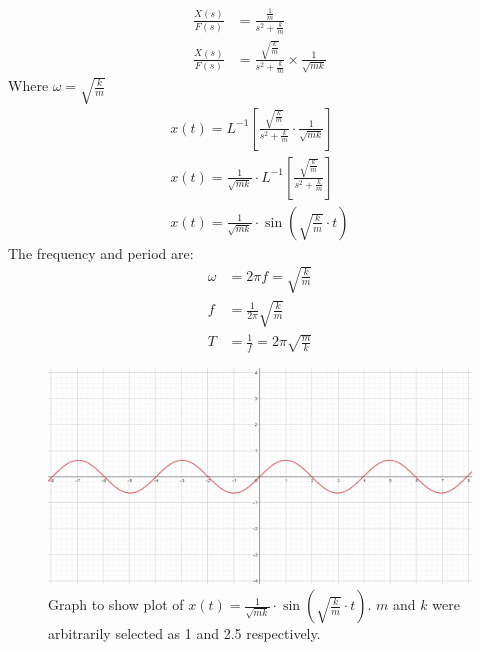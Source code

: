 \documentclass[12pt]{article}
\numberwithin{equation}{section}
\begin{document}
\begin{align}
  \frac{X(s)}{F(s)} &= \frac{\frac{1}{m}}{s^2 + \frac{k}{m}}\\
  \frac{X(s)}{F(s)} &= \frac{\sqrt{\frac{k}{m}}}{s^2 + \frac{k}{m}} \times \frac{1}{\sqrt{mk}}
\end{align}
Where $\omega = \sqrt{\frac{k}{m}}$
\begin{align}
  x(t) = L^{-1} \left[ \frac{\sqrt{\frac{k}{m}}}{s^2 + \frac{k}{m}} \cdot \frac{1}{\sqrt{mk}} \right]\\
  x(t) = \frac{1}{\sqrt{mk}} \cdot L^{-1} \left[ \frac{\sqrt{\frac{k}{m}}}{s^2 + \frac{k}{m}} \right]\\
  x(t) = \frac{1}{\sqrt{mk}} \cdot \sin{\left(\sqrt{\frac{k}{m}}\cdot t\right)}
\end{align}
The frequency and period are:
\begin{align}
  \omega &= 2\pi f = \sqrt{\frac{k}{m}}\\
  f &= \frac{1}{2\pi}\sqrt{\frac{k}{m}}\\
  T &= \frac{1}{f} = 2\pi\sqrt{\frac{m}{k}}
\end{align}
\begin{figure}[H]
  \centering
  \includegraphics[width=\textwidth]{./img/3-1timeresponse.png}
  \caption{Graph to show plot of $x(t) = \frac{1}{\sqrt{mk}} \cdot \sin{\left(\sqrt{\frac{k}{m}}\cdot t\right)}$. $m$ and $k$ were arbitrarily selected as 1 and 2.5 respectively.}
\end{figure}
\end{document}
